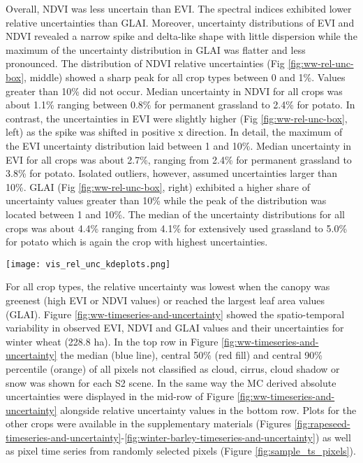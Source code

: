 Overall, \gls{NDVI} was less uncertain than EVI. The spectral indices exhibited lower relative uncertainties than \gls{GLAI}. Moreover, uncertainty distributions of \gls{EVI} and \gls{NDVI} revealed a narrow spike and delta-like shape with little dispersion while the maximum of the uncertainty distribution in \gls{GLAI} was flatter and less pronounced. The distribution of \gls{NDVI} relative uncertainties (Fig \ref{fig:ww-rel-unc-box}, middle) showed a sharp peak for all crop types between 0 and 1\%. Values greater than 10\% did not occur. Median uncertainty in \gls{NDVI} for all crops was about 1.1\% ranging between 0.8\% for permanent grassland to 2.4\% for potato. In contrast, the uncertainties in \gls{EVI} were slightly higher (Fig \ref{fig:ww-rel-unc-box}, left) as the spike was shifted in positive x direction. In detail, the maximum of the \gls{EVI} uncertainty distribution laid between 1 and 10\%. Median uncertainty in \gls{EVI} for all crops was about 2.7\%, ranging from 2.4\% for permanent grassland to 3.8\% for potato. Isolated outliers, however, assumed uncertainties larger than 10\%. \gls{GLAI} (Fig \ref{fig:ww-rel-unc-box}, right) exhibited a higher share of uncertainty values greater than 10\% while the peak of the distribution was located between 1 and 10\%. The median of the uncertainty distributions for all crops was about 4.4\% ranging from 4.1\% for extensively used grassland to 5.0\% for potato which is again the crop with highest uncertainties.

\begin{figure*}
    \centering
    \texttt{[image: vis\_rel\_unc\_kdeplots.png]}
    \caption{Kernel density based distributions of MC-derived relative uncertainty values in \gls{EVI} (left), \gls{NDVI} (middle) and \gls{GLAI} (right) considering all available crop pixels and \gls{S2} scenes excluding pixel observations not classified as "vegetated" (SCL class 4) or "non-vegetated" (SCL class 5). Contributions to relative uncertainty per crop type are color coded. To improve readability, the x-axis has been log-scaled.}
    \label{fig:ww-rel-unc-box}
\end{figure*}

For all crop types, the relative uncertainty was lowest when the canopy was greenest (high \gls{EVI} or \gls{NDVI} values) or reached the largest leaf area values (GLAI). Figure \ref{fig:ww-timeseries-and-uncertainty} showed the spatio-temporal variability in observed EVI, \gls{NDVI} and \gls{GLAI} values and their uncertainties for winter wheat (228.8 ha). In the top row in Figure \ref{fig:ww-timeseries-and-uncertainty} the median (blue line), central 50\% (red fill) and central 90\% percentile (orange) of all pixels not classified as cloud, cirrus, cloud shadow or snow was shown for each \gls{S2} scene. In the same way the  \gls{MC} derived absolute uncertainties were displayed in the mid-row of Figure \ref{fig:ww-timeseries-and-uncertainty} alongside relative uncertainty values in the bottom row. Plots for the other crops were available in the supplementary materials (Figures \ref{fig:rapeseed-timeseries-and-uncertainty}-\ref{fig:winter-barley-timeseries-and-uncertainty}) as well as pixel time series from randomly selected pixels (Figure \ref{fig:sample_ts_pixels}).

